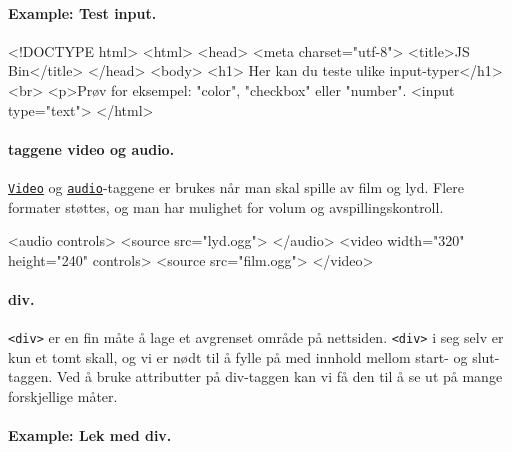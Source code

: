 \documentclass[%
oneside,                 %
final,                   %
10pt]{article}
\newenvironment{notice_mdfboxadmon}[1][]{
\begin{notice_mdfboxmdframed}[frametitle=#1]
}
{
\end{notice_mdfboxmdframed}
}
\begin{document}
\paragraph{Example: Test input.}
\label{example:testinput}


\begin{notice_mdfboxadmon}
\bhtml
<!DOCTYPE html>
<html>
<head>
    <meta charset="utf-8">
    <title>JS Bin</title>
</head>
<body>
    <h1> Her kan du teste ulike input-typer</h1><br>
    <p>Prøv for eksempel: "color", "checkbox" eller "number".
    <input type="text">
</html>
\ehtml
\end{notice_mdfboxadmon}

 

\paragraph{taggene video og audio.}


\href{{http://www.w3schools.com/tags/tag_video.asp}}{\nolinkurl{Video}} og
\href{{http://www.w3schools.com/tags/tag_audio.asp}}{\nolinkurl{audio}}-taggene er
brukes når man skal spille av film og lyd. Flere formater støttes, og
man har mulighet for volum og avspillingskontroll.


\begin{notice_mdfboxadmon}
\bhtml
<audio controls>
    <source src="lyd.ogg">
</audio>
<video width="320" height="240" controls>
  <source src="film.ogg">
</video>
\ehtml
\end{notice_mdfboxadmon}

 

\paragraph{div.}

\texttt{<div>} er en fin måte å lage et avgrenset område på
nettsiden. \texttt{<div>} i seg selv er kun et tomt skall, og vi er nødt til
å fylle på med innhold mellom start- og slut-taggen. Ved å bruke
attributter på div-taggen kan vi få den til å se ut på mange
forskjellige måter.

\paragraph{Example: Lek med div.}
\label{example:Lekmeddiv}
\end{document}

